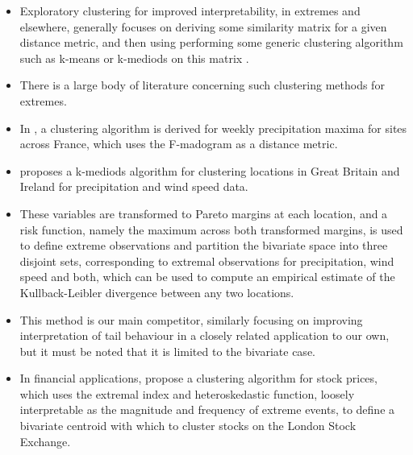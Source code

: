 \documentclass{article}
\numberwithin{equation}{section}
\begin{document}
\begin{itemize}
  \item Exploratory clustering for improved interpretability, in extremes and elsewhere, generally focuses on deriving some similarity matrix for a given distance metric, and then using performing some generic clustering algorithm such as k-means or k-mediods on this matrix \citet{Lloyd1957} \citet{Kaufman1987}.
  \item There is a large body of literature concerning such clustering methods for extremes. 
  \item In \citet{Bernard2013}, a clustering algorithm is derived for weekly precipitation maxima for sites across France, which uses the F-madogram as a distance metric.
  \item \citet{Vignotto2021} proposes a k-mediods algorithm for clustering locations in Great Britain and Ireland for precipitation and wind speed data.
  \item These variables are transformed to Pareto margins at each location, and a risk function, namely the maximum across both transformed margins, is used to define extreme observations and partition the bivariate space into three disjoint sets, corresponding to extremal observations for precipitation, wind speed and both, which can be used to compute an empirical estimate of the Kullback-Leibler divergence \citep{Kullback1951} between any two locations.
  \item This method is our main competitor, similarly focusing on improving interpretation of tail behaviour in a closely related application to our own, but it must be noted that it is limited to the bivariate case.
  \item In financial applications, \citet{deCarvalho2023} propose a clustering algorithm for stock prices, which uses the extremal index and heteroskedastic function, loosely interpretable as the magnitude and frequency of extreme events, to define a bivariate centroid with which to cluster stocks on the London Stock Exchange. 
\end{itemize}

\vspace{1cm}
\end{document}
